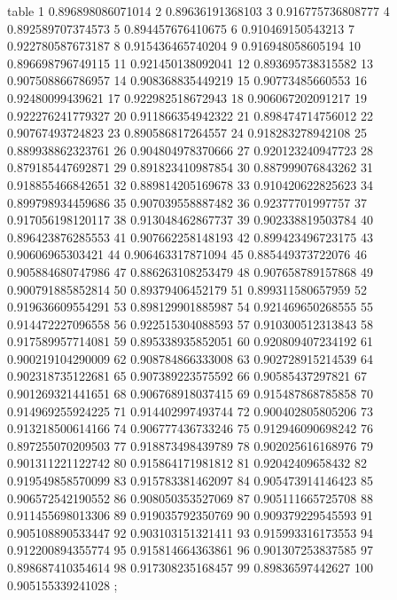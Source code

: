 \nextgroupplot[title=Seed 0,
height=\figheight,
legend cell align={left},
legend columns=-1,
legend style={
  nodes={scale=0.85},
  fill opacity=0.8,
  draw opacity=1,
  text opacity=1,
  at={(-0.20,1.36)},%
  anchor=south west,
  draw=white!80!black
},
minor xtick={25, 75},
minor ytick={},
tick align=outside,
tick pos=left,
width=\figwidth,
x grid style={white!69.0196078431373!black},
xlabel={Eval. Steps},
xminorgrids,
xmajorgrids,
xmin=-3.95, xmax=104.95,
xtick style={color=black},
xtick={-25,0,50,100,125},
xticklabels={-25,0,50,100,125},
y grid style={white!69.0196078431373!black},
ylabel={ACC (\%)},
ymajorgrids,
ymin=0.874287720084191, ymax=0.982037727475166,
ytick style={color=black},
ytick={0.86,0.88,0.9,0.92,0.94,0.96,0.98,1},
yticklabels={86,88,90,92,94,96,98,100}
]
table {%
	1 0.896898086071014
	2 0.89636191368103
	3 0.916775736808777
	4 0.892589707374573
	5 0.894457676410675
	6 0.910469150543213
	7 0.922780587673187
	8 0.915436465740204
	9 0.916948058605194
	10 0.896698796749115
	11 0.921450138092041
	12 0.893695738315582
	13 0.907508866786957
	14 0.908368835449219
	15 0.90773485660553
	16 0.92480099439621
	17 0.922982518672943
	18 0.906067202091217
	19 0.922276241779327
	20 0.911866354942322
	21 0.898474714756012
	22 0.90767493724823
	23 0.890586817264557
	24 0.918283278942108
	25 0.889938862323761
	26 0.904804978370666
	27 0.920123240947723
	28 0.879185447692871
	29 0.891823410987854
	30 0.887999076843262
	31 0.918855466842651
	32 0.889814205169678
	33 0.910420622825623
	34 0.899798934459686
	35 0.907039558887482
	36 0.92377701997757
	37 0.917056198120117
	38 0.913048462867737
	39 0.902338819503784
	40 0.896423876285553
	41 0.907662258148193
	42 0.899423496723175
	43 0.90606965303421
	44 0.906463317871094
	45 0.885449373722076
	46 0.905884680747986
	47 0.886263108253479
	48 0.907658789157868
	49 0.900791885852814
	50 0.89379406452179
	51 0.899311580657959
	52 0.919636609554291
	53 0.898129901885987
	54 0.921469650268555
	55 0.914472227096558
	56 0.922515304088593
	57 0.910300512313843
	58 0.917589957714081
	59 0.895338935852051
	60 0.920809407234192
	61 0.900219104290009
	62 0.908784866333008
	63 0.902728915214539
	64 0.902318735122681
	65 0.907389223575592
	66 0.90585437297821
	67 0.901269321441651
	68 0.906768918037415
	69 0.915487868785858
	70 0.914969255924225
	71 0.914402997493744
	72 0.900402805805206
	73 0.913218500614166
	74 0.906777436733246
	75 0.912946090698242
	76 0.897255070209503
	77 0.918873498439789
	78 0.902025616168976
	79 0.901311221122742
	80 0.915864171981812
	81 0.92042409658432
	82 0.919549858570099
	83 0.915783381462097
	84 0.905473914146423
	85 0.906572542190552
	86 0.908050353527069
	87 0.905111665725708
	88 0.911455698013306
	89 0.919035792350769
	90 0.909379229545593
	91 0.905108890533447
	92 0.903103151321411
	93 0.915993316173553
	94 0.912200894355774
	95 0.915814664363861
	96 0.901307253837585
	97 0.898687410354614
	98 0.917308235168457
	99 0.89836597442627
	100 0.905155339241028
};
